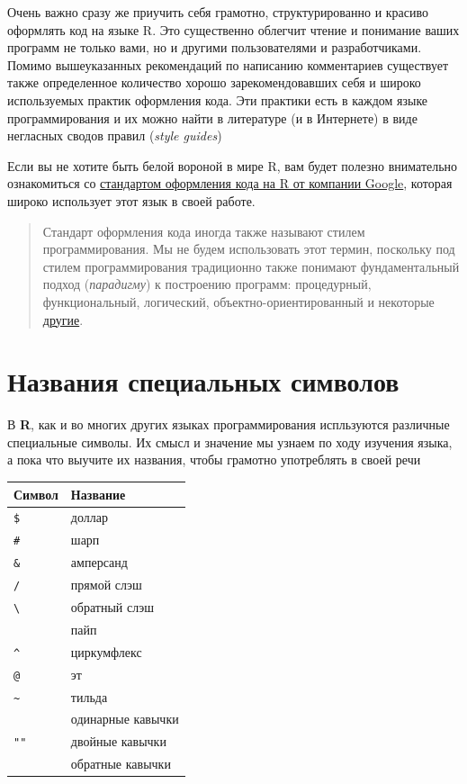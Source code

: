 \documentclass[]{book}
\begin{document}
Очень важно сразу же приучить себя грамотно, структурированно и красиво
оформлять код на языке R. Это существенно облегчит чтение и понимание
ваших программ не только вами, но и другими пользователями и
разработчиками. Помимо вышеуказанных рекомендаций по написанию
комментариев существует также определенное количество хорошо
зарекомендовавших себя и широко используемых практик оформления кода.
Эти практики есть в каждом языке программирования и их можно найти в
литературе (и в Интернете) в виде негласных сводов правил (\emph{style
guides})

Если вы не хотите быть белой вороной в мире R, вам будет полезно
внимательно ознакомиться со
\href{https://google.github.io/styleguide/Rguide.xml\#filenames}{стандартом
оформления кода на R от компании Google}, которая широко использует этот
язык в своей работе.

\begin{quote}
Стандарт оформления кода иногда также называют стилем программирования.
Мы не будем использовать этот термин, поскольку под стилем
программирования традиционно также понимают фундаментальный подход
(\emph{парадигму}) к построению программ: процедурный, функциональный,
логический, объектно-ориентированный и некоторые
\href{https://ru.wikipedia.org/wiki/Парадигма_программирования}{другие}.
\end{quote}

\section*{Названия специальных символов}\label{--}

В \textbf{R}, как и во многих других языках программирования испльзуются
различные специальные символы. Их смысл и значение мы узнаем по ходу
изучения языка, а пока что выучите их названия, чтобы грамотно
употреблять в своей речи

\begin{longtable}[]{@{}ll@{}}
\toprule
Символ & Название\tabularnewline
\midrule
\endhead
\texttt{\$} & доллар\tabularnewline
\texttt{\#} & шарп\tabularnewline
\texttt{\&} & амперсанд\tabularnewline
\texttt{/} & прямой слэш\tabularnewline
\texttt{\textbackslash{}} & обратный слэш\tabularnewline
\texttt{\textbar{}} & пайп\tabularnewline
\texttt{\^{}} & циркумфлекс\tabularnewline
\texttt{@} & эт\tabularnewline
\texttt{\textasciitilde{}} & тильда\tabularnewline
\texttt{\textquotesingle{}\textquotesingle{}} & одинарные
кавычки\tabularnewline
\texttt{""} & двойные кавычки\tabularnewline
\texttt{\textasciigrave{}\textasciigrave{}} & обратные
кавычки\tabularnewline
\bottomrule
\end{longtable}
\end{document}
